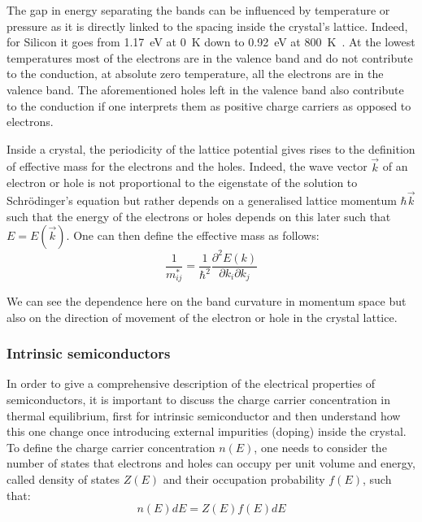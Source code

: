 		The gap in energy separating the bands can be influenced by temperature or pressure as it is directly linked to the spacing inside the crystal's lattice. Indeed, for Silicon it goes from \SI{1.17}{\electronvolt} at \SI{0}{\kelvin} down to \SI{0.92}{\electronvolt} at \SI{800}{\kelvin}\ \cite{PhysicsOfSemiconductors}. At the lowest temperatures most of the electrons are in the valence band and do not contribute to the conduction, at absolute zero temperature, all the electrons are in the valence band. The aforementioned holes left in the valence band also contribute to the conduction if one interprets them as positive charge carriers as opposed to electrons. 

		Inside a crystal, the periodicity of the lattice potential gives rises to the definition of effective mass for the electrons and the holes. Indeed, the wave vector $\vec{k}$ of an electron or hole is not proportional to the eigenstate of the solution to Schrödinger's equation but rather depends on a generalised lattice momentum $\hbar \vec{k}$ such that the energy of the electrons or holes depends on this later such that $E = E(\vec{k})$. One can then define the effective mass as follows: 
		\begin{equation}
			\frac{1}{m_{ij}^*} = \frac{1}{\hbar^2}\frac{\partial^2 E(k)}{\partial k_i \partial k_j}
			\label{eq:effective_mass}
		\end{equation}

		We can see the dependence here on the band curvature in momentum space but also on the direction of movement of the electron or hole in the crystal lattice.
		
		\subsubsection{Intrinsic semiconductors}

		In order to give a comprehensive description of the electrical properties of semiconductors, it is important to discuss the charge carrier concentration in thermal equilibrium, first for intrinsic semiconductor and then understand how this one change once introducing external impurities (doping) inside the crystal. To define the charge carrier concentration $n(E)$, one needs to consider the number of states that electrons and holes can occupy per unit volume and energy, called density of states $Z(E)$ and their occupation probability $f(E)$, such that: 
		\begin{equation}
			n(E) dE = Z(E) f(E) dE
		\end{equation}


